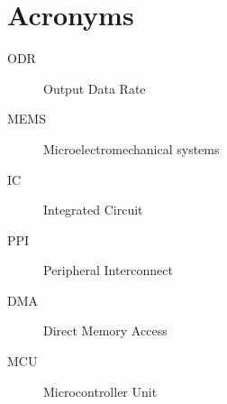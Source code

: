 
\chapter{Acronyms}
\begin{description}
\item[ODR] Output Data Rate
\item[MEMS] Microelectromechanical systems
\item[IC] Integrated Circuit
\item[PPI] Peripheral Interconnect
\item[DMA] Direct Memory Access
\item[MCU] Microcontroller Unit

\end{description}